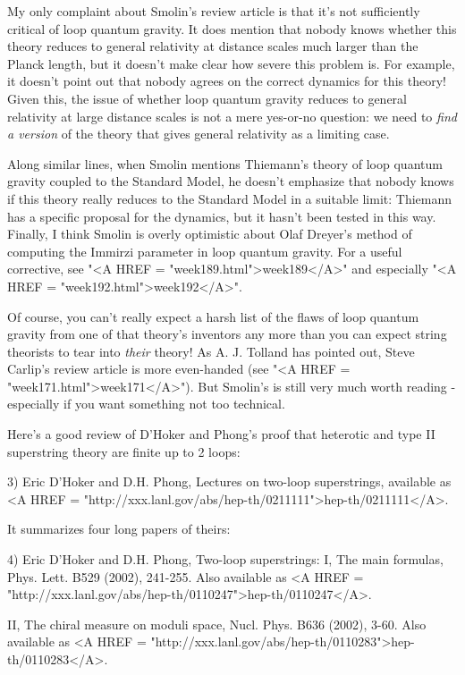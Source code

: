 My only complaint about Smolin's review article is that it's not 
sufficiently critical of loop quantum gravity.  It does mention 
that nobody knows whether this theory reduces to general relativity 
at distance scales much larger than the Planck length, but it doesn't 
make clear how severe this problem is.  For example, it doesn't point
out that nobody agrees on the correct dynamics for this theory!  Given 
this, the issue of whether loop quantum gravity reduces to general 
relativity at large distance scales is not a mere yes-or-no question: 
we need to \emph{find a version} of the theory that gives general relativity 
as a limiting case.  


Along similar lines, when Smolin mentions Thiemann's theory of loop
quantum gravity coupled to the Standard Model, he doesn't emphasize
that nobody knows if this theory really reduces to the Standard Model
in a suitable limit: Thiemann has a specific proposal for the
dynamics, but it hasn't been tested in this way.  Finally, I think
Smolin is overly optimistic about Olaf Dreyer's method of computing
the Immirzi parameter in loop quantum gravity.  For a useful
corrective, see "<A HREF = "week189.html">week189</A>" and
especially "<A HREF = "week192.html">week192</A>".


Of course, you can't really expect a harsh list of the flaws of loop
quantum gravity from one of that theory's inventors any more than you
can expect string theorists to tear into \emph{their} theory!  As
A. J. Tolland has pointed out, Steve Carlip's review article is more
even-handed (see "<A HREF = "week171.html">week171</A>").
But Smolin's is still very much worth reading - especially if you want
something not too technical.

Here's a good review of D'Hoker and Phong's proof that heterotic
and type II superstring theory are finite up to 2 loops:


3) Eric D'Hoker and D.H. Phong, Lectures on two-loop superstrings,
available as <A HREF =
"http://xxx.lanl.gov/abs/hep-th/0211111">hep-th/0211111</A>.

It summarizes four long papers of theirs:

4) Eric D'Hoker and D.H. Phong, Two-loop superstrings: I, The main formulas, 
Phys. Lett. B529 (2002), 241-255.  Also available as <A HREF = "http://xxx.lanl.gov/abs/hep-th/0110247">hep-th/0110247</A>.  

II, The chiral measure on moduli space, Nucl. Phys. B636 (2002), 3-60.
Also available as <A HREF = "http://xxx.lanl.gov/abs/hep-th/0110283">hep-th/0110283</A>.  

